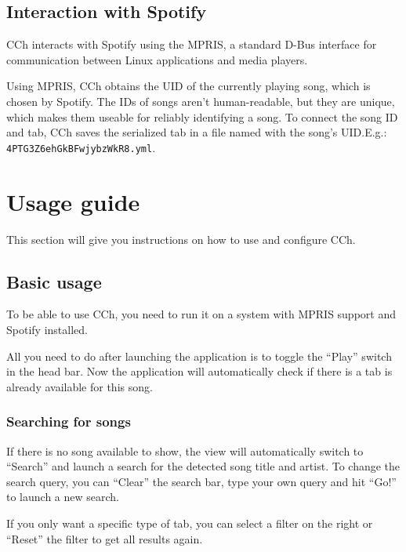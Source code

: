 \documentclass[12pt, a4paper]{article}
\begin{document}
                \subsection{Interaction with Spotify}
                        CCh interacts with Spotify using the MPRIS, a standard D-Bus interface for communication between Linux applications and media players.\@

                        Using MPRIS, CCh obtains the UID of the currently playing song, which is chosen by Spotify. The IDs of songs aren't human-readable, but they are unique, which makes them useable for reliably identifying a song. To connect the song ID and tab, CCh saves the serialized tab in a file named with the song's UID.\@ E.g.: \texttt{4PTG3Z6ehGkBFwjybzWkR8.yml}.
        
        \section{Usage guide}
                This section will give you instructions on how to use and configure CCh.

                \subsection{Basic usage}
                        To be able to use CCh, you need to run it on a system with MPRIS support and Spotify installed.

                        All you need to do after launching the application is to toggle the ``Play'' switch in the head bar. Now the application will automatically check if there is a tab is already available for this song. 
                        
                        \subsubsection{Searching for songs}
                                If there is no song available to show, the view will automatically switch to ``Search'' and launch a search for the detected song title and artist.
                                To change the search query, you can ``Clear'' the search bar, type your own query and hit ``Go!'' to launch a new search.

                                If you only want a specific type of tab, you can select a filter on the right or ``Reset'' the filter to get all results again.
\end{document}
